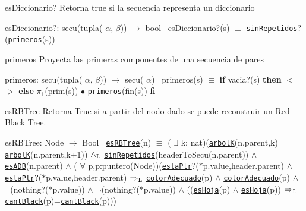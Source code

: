 \begin{DoxyParagraph}{es\+Diccionario?}
Retorna true si la secuencia representa un diccionario

es\+Diccionario?\+: secu(tupla( $\alpha$, $\beta$)) $\to$ bool~\newline
 es\+Diccionario?(s) $\equiv$ \href{axiomas.html#sinRepetidos}{\tt sin\+Repetidos}?(\href{axiomas.html#primeros}{\tt primeros}(s)) 
\end{DoxyParagraph}


\begin{DoxyParagraph}{primeros}
Proyecta las primeras componentes de una secuencia de pares

primeros\+: secu(tupla( $\alpha$, $\beta$)) $\to$ secu( $\alpha$)~\newline
 primeros(s) $\equiv$ {\bfseries if} vacia?(s) {\bfseries then} $<$$>$ {\bfseries else} $\pi_1$(prim(s)) $\bullet$ \href{axiomas.html#primeros}{\tt primeros}(fin(s)) {\bfseries fi} 
\end{DoxyParagraph}


\begin{DoxyParagraph}{es\+R\+B\+Tree}
Retorna True si a partir del nodo dado se puede reconstruir un Red-\/\+Black Tree.

es\+R\+B\+Tree\+: Node $\to$ Bool~\newline
 \href{axiomas.html#esRBTree}{\tt es\+R\+B\+Tree}(n) $\equiv$ ( $\exists$ k\+: nat)(\href{axiomas.html#arbolK}{\tt arbolK}(n.\+parent,k) = \href{axiomas.html#arbolK}{\tt arbolK}(n.\+parent,k+1)) $\land_{\rm L}$ \href{axiomas.html#sinRepetidos}{\tt sin\+Repetidos}(header\+To\+Secu(n.\+parent)) $\land$ \href{axiomas.html#esADB}{\tt es\+A\+DB}(n.\+parent) $\land$ ( $\forall$ p,p\textquotesingle{}\+:puntero(\+Node))(\href{axiomas.html#estaPtr}{\tt esta\+Ptr}?($\ast$p.value,header.\+parent) $\land$ \href{axiomas.html#estaPtr}{\tt esta\+Ptr}?($\ast$p\textquotesingle{}.value,header.\+parent) $\Rightarrow_{\rm L}$ \href{axiomas.html#colorAdecuado}{\tt color\+Adecuado}(p) $\land$ \href{axiomas.html#colorAdecuado}{\tt color\+Adecuado}(p\textquotesingle{}) $\land$ $\lnot$(nothing?($\ast$p.value)) $\land$ $\lnot$(nothing?($\ast$p\textquotesingle{}.value)) $\land$ ((\href{axiomas.html#esHoja}{\tt es\+Hoja}(p) $\land$ \href{axiomas.html#esHoja}{\tt es\+Hoja}(p\textquotesingle{})) $\Rightarrow_{\rm L}$ \href{axiomas.html#cantBlack}{\tt cant\+Black}(p)=\href{axiomas.html#cantBlack}{\tt cant\+Black}(p\textquotesingle{}))) 
\end{DoxyParagraph}


